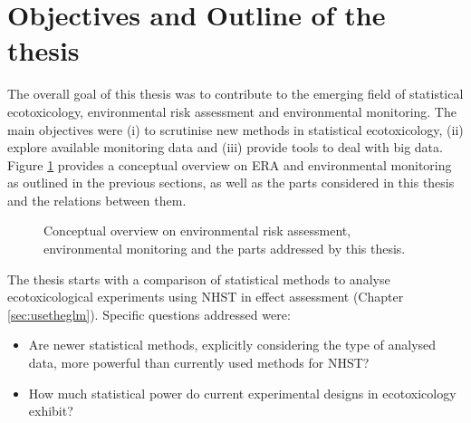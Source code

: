 \newpage
\section{Objectives and Outline of the thesis}

The overall goal of this thesis was to contribute to the emerging field of statistical ecotoxicology, environmental risk assessment and environmental monitoring.
The main objectives were (i) to scrutinise new methods in statistical ecotoxicology,
(ii) explore available monitoring data and
(iii) provide tools to deal with big data.
Figure \ref{fig:intro:overview} provides a conceptual overview on ERA and environmental monitoring as outlined in the previous sections, as well as the parts considered in this thesis and the relations between them. 

\begin{figure}[h]
	\vspace{1em}
    \hspace*{-1cm} 
	\resizebox{1\textwidth}{!}{%
		
	}
	\caption[Conceptual overview of the topics addressed by this thesis]{Conceptual overview on environmental risk assessment, environmental monitoring and the parts addressed by this thesis.}
	\label{fig:intro:overview}
\end{figure}

\noindent The thesis starts with a comparison of statistical methods to analyse ecotoxicological experiments using NHST in effect assessment (Chapter \ref{sec:usetheglm}). 
Specific questions addressed were:

\begin{itemize}
	\item Are newer statistical methods, explicitly considering the type of analysed data, more powerful than currently used methods for NHST?
	\item How much statistical power do current experimental designs in ecotoxicology exhibit?
\end{itemize}


